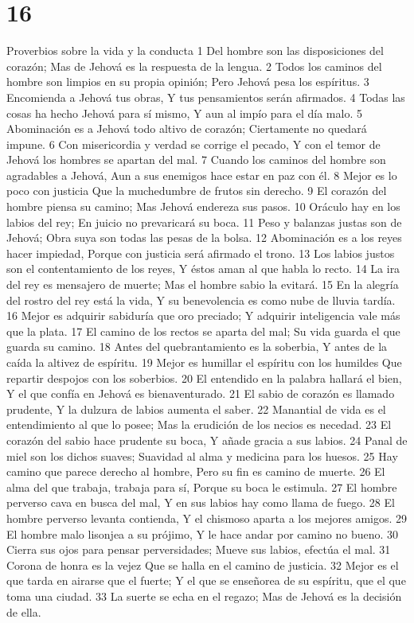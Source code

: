 \chapter{16}

Proverbios sobre la vida y la conducta
1 Del hombre son las disposiciones del corazón;
Mas de Jehová es la respuesta de la lengua.
2 Todos los caminos del hombre son limpios en su propia opinión;
Pero Jehová pesa los espíritus.
3 Encomienda a Jehová tus obras,
Y tus pensamientos serán afirmados.
4 Todas las cosas ha hecho Jehová para sí mismo,
Y aun al impío para el día malo.
5 Abominación es a Jehová todo altivo de corazón;
Ciertamente no quedará impune.
6 Con misericordia y verdad se corrige el pecado,
Y con el temor de Jehová los hombres se apartan del mal.
7 Cuando los caminos del hombre son agradables a Jehová,
Aun a sus enemigos hace estar en paz con él.
8 Mejor es lo poco con justicia 
Que la muchedumbre de frutos sin derecho.
9 El corazón del hombre piensa su camino;
Mas Jehová endereza sus pasos.
10 Oráculo hay en los labios del rey;
En juicio no prevaricará su boca.
11 Peso y balanzas justas son de Jehová;
Obra suya son todas las pesas de la bolsa.
12 Abominación es a los reyes hacer impiedad,
Porque con justicia será afirmado el trono.
13 Los labios justos son el contentamiento de los reyes,
Y éstos aman al que habla lo recto.
14 La ira del rey es mensajero de muerte;
Mas el hombre sabio la evitará.
15 En la alegría del rostro del rey está la vida,
Y su benevolencia es como nube de lluvia tardía.
16 Mejor es adquirir sabiduría que oro preciado;
Y adquirir inteligencia vale más que la plata. 
17 El camino de los rectos se aparta del mal;
Su vida guarda el que guarda su camino.
18 Antes del quebrantamiento es la soberbia,
Y antes de la caída la altivez de espíritu.
19 Mejor es humillar el espíritu con los humildes
Que repartir despojos con los soberbios.
20 El entendido en la palabra hallará el bien,
Y el que confía en Jehová es bienaventurado.
21 El sabio de corazón es llamado prudente,
Y la dulzura de labios aumenta el saber.
22 Manantial de vida es el entendimiento al que lo posee;
Mas la erudición de los necios es necedad.
23 El corazón del sabio hace prudente su boca,
Y añade gracia a sus labios.
24 Panal de miel son los dichos suaves;
Suavidad al alma y medicina para los huesos.
25 Hay camino que parece derecho al hombre,
Pero su fin es camino de muerte. 
26 El alma del que trabaja, trabaja para sí,
Porque su boca le estimula.
27 El hombre perverso cava en busca del mal,
Y en sus labios hay como llama de fuego.
28 El hombre perverso levanta contienda,
Y el chismoso aparta a los mejores amigos.
29 El hombre malo lisonjea a su prójimo,
Y le hace andar por camino no bueno.
30 Cierra sus ojos para pensar perversidades;
Mueve sus labios, efectúa el mal.
31 Corona de honra es la vejez
Que se halla en el camino de justicia.
32 Mejor es el que tarda en airarse que el fuerte;
Y el que se enseñorea de su espíritu, que el que toma una ciudad.
33 La suerte se echa en el regazo;
Mas de Jehová es la decisión de ella.


